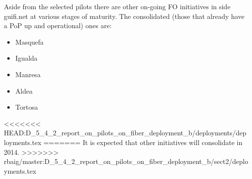 Aside from the selected pilots there are other on-going FO initiatives in side guifi.net at various stages of maturity. The consolidated (those that already have a PoP up and operational) ones are:

\begin{itemize}
\item Masquefa
\item Igualda
\item Manresa
\item Aldea
\item Tortosa
\end{itemize}

<<<<<<< HEAD:D_5_4_2_report_on_pilots_on_fiber_deployment_b/deployments/deployments.tex
%
=======
It is expected that other initiatives will consolidate in 2014.
>>>>>>> rbaig/master:D_5_4_2_report_on_pilots_on_fiber_deployment_b/sect2/deployments.tex

